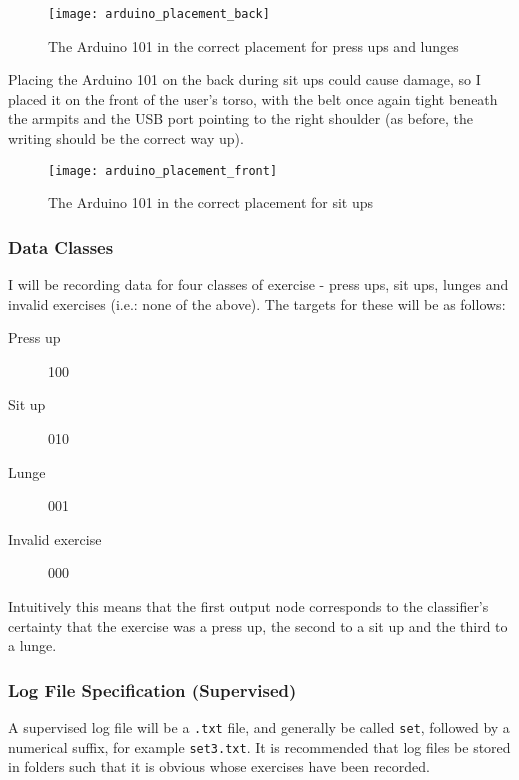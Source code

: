 \documentclass[a4paper]{article}
\begin{document}
\begin{figure}[H]
    \centering
        \texttt{[image: arduino\_placement\_back]}
        \caption{The Arduino 101 in the correct placement for press ups and lunges}
        \label{fig:ar_placement_back}
\end{figure}

Placing the Arduino 101 on the back during sit ups could cause damage, so I placed it on the front of the user's torso, with the belt once again tight beneath the armpits and the USB port pointing to the right shoulder (as before, the writing should be the correct way up).

\begin{figure}[H]
    \centering
        \texttt{[image: arduino\_placement\_front]}
        \caption{The Arduino 101 in the correct placement for sit ups}
        \label{fig:ar_placement_front}
\end{figure}

\subsubsection{Data Classes}
\label{subsubsec:dc_dc_classes}

I will be recording data for four classes of exercise - press ups, sit ups, lunges and invalid exercises (i.e.: none of the above). The targets for these will be as follows:

\begin{description}
\item[Press up] 100
\item[Sit up] 010
\item[Lunge] 001
\item[Invalid exercise] 000
\end{description}

Intuitively this means that the first output node corresponds to the classifier's certainty that the exercise was a press up, the second to a sit up and the third to a lunge. 

\subsubsection{Log File Specification (Supervised)}

A supervised log file will be a \lstinline{.txt} file, and generally be called \lstinline{set}, followed by a numerical suffix, for example \lstinline{set3.txt}. It is recommended that log files be stored in folders such that it is obvious whose exercises have been recorded.
\end{document}
